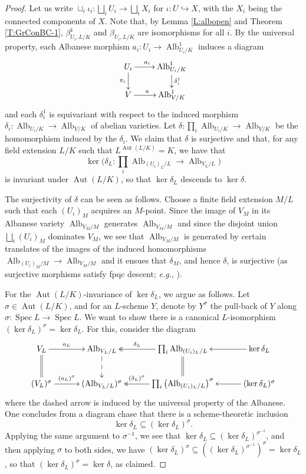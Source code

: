 \documentclass[11pt, reqno]{amsart}
\numberwithin{equation}{section}
\theoremstyle{definition}
\theoremstyle{remark}
\DeclareMathOperator{\aut}{Aut}
\DeclareMathOperator{\alb}{Alb}
\begin{document}
 \begin{proof}
                 Let us write $\sqcup_i \iota_i : \bigsqcup_i U_i \to \bigsqcup_i X_i$ for $\iota : U \hookrightarrow X$, with the $X_i$ being the connected components of $X$.
  Note that, by Lemma \ref{L:albopen} and
  Theorem \ref{T:GrConBC-1}, $\beta^1_{U_i,L/K}$ and $\beta_{U_i,L/K}$ are
  isomorphisms for all $i$.
   By the universal property, each Albanese morphism $a_i : U_i \to \alb^1_{U_i/K}$ induces a diagram
  \[
  \xymatrix@R=1.5em{
   U_i \ar[r]^{a_i \ \ } \ar[d]_{\pi_i} & \alb^1_{U_i/K}\ar[d]^{\delta^1_i}\\
   V \ar[r]^{a \ \ }&  \alb^1_{V/K}
  }
  \]
  and each $\delta^1_i$ is equivariant with respect to the induced
  morphism $\delta_i: \alb_{U_i/K} \to \alb_{V/K}$ of abelian
  varieties.  
  Let $\delta : \prod_i \alb_{U_i/K} \to \alb_{V/K}$ be the homomorphism induced by the $\delta_i$.
  We claim that $\delta$ is surjective and that, for any field extension $L/K$ such that $L^{\aut(L/K)} = K$, we have that 
   $$\ker  \big(\delta_L : \prod_i \alb_{(U_i)_L/L} \to \alb_{V_L/L}\big)$$
    is invariant under $\operatorname{Aut}(L/K)$, so that $\ker \delta_L$ descends to $\ker \delta$.  
      
  The surjectivity of $\delta$ can be seen as follows. Choose a finite field extension $M/L$ such that each $(U_i)_M$ acquires an $M$-point. Since the image of $V_M$ in its Albanese variety $\alb_{V_M/M}$ generates $\alb_{V_M/M}$ and since the disjoint union $\bigsqcup_i(U_i)_M$ dominates $V_M$, we see that $\alb_{V_M/M}$ is generated by certain translates of the images of the induced homomorphisms $\alb_{(U_i)_M/M} \to \alb_{V_M/M}$ and it ensues that $\delta_M$, and hence $\delta$, is surjective (as surjective morphisms satisfy fpqc descent; \emph{e.g.}, \cite[p.584]{GW20}).
  
For the $\operatorname{Aut}(L/K)$-invariance of $\ker \delta_L$, we argue as follows.  Let $\sigma\in \operatorname{Aut}(L/K)$, and for an $L$-scheme $Y$, denote by  $Y^\sigma$ the pull-back of $Y$ along $\sigma:\operatorname{Spec}L\to \operatorname{Spec}L$.  
   We want to show there is a canonical $L$-isomorphism $(\ker \delta_L)^\sigma= \ker \delta_L$. For this, consider the diagram
$$
\xymatrix@C=3em{
V_L\ar[r]^<>(0.5){a_L} \ar@{=}[d]& \operatorname{Alb}_{V_L/L} \ar@{-->}[d]& \prod_i\operatorname{Alb}_{(U_i)_L/L}  \ar@{=}[d] \ar@{->>}[l]_<>(0.5){\delta_L}& \ker \delta_L \ar[l]\\
(V_L)^\sigma\ar[r]^<>(0.5){(a_L)^\sigma} & (\operatorname{Alb}_{V_L/L})^\sigma & \prod_i\left(\operatorname{Alb}_{(U_i)_L/L}\right)^\sigma \ar@{->>}[l]_<>(0.5){(\delta_L)^\sigma}& (\ker \delta_L)^\sigma \ar[l]
}
$$
where the dashed arrow is induced by the universal property of the
Albanese. One concludes from a diagram chase that there is a
scheme-theoretic inclusion
$$
\ker \delta_L\subseteq (\ker \delta_L)^\sigma.
$$
Applying the same argument to $\sigma^{-1}$, we see that $\ker \delta_L\subseteq (\ker \delta_L)^{\sigma^{-1}}$, and then applying $\sigma$ to both sides, we have
$
(\ker \delta_L)^\sigma \subseteq ((\ker \delta_L)^{\sigma^{-1}})^\sigma = \ker \delta_L$, so that $(\ker \delta_L)^\sigma =\ker \delta$, as claimed.


\end{proof}
\end{document}

